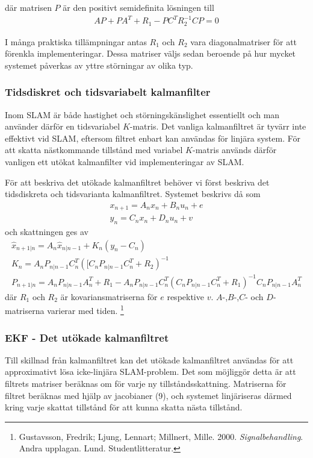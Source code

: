 \documentclass[a4paper,12pt,fleqn]{article}
\begin{document}
där matrisen $P$ är den positivt semidefinita lösningen till 
\begin{gather}
AP + PA^{T} + R_{1} - PC^{T}R_{2}^{-1}CP = 0
\end{gather}

I många praktiska tillämpningar antas $R_{1}$ och $R_{2}$ vara diagonalmatriser för att förenkla implementeringar. Dessa matriser väljs sedan beroende på hur mycket systemet påverkas av yttre störningar av olika typ. 

\subsubsection{Tidsdiskret och tidsvariabelt kalmanfilter} Inom SLAM är både hastighet och störningskänslighet essentiellt och man använder därför en tidsvariabel $K$-matris. Det vanliga kalmanfiltret är tyvärr inte effektivt vid SLAM, eftersom filtret enbart kan användas för linjära system. För att skatta nästkommande tillstånd med variabel $K$-matris används därför vanligen ett utökat kalmanfilter vid implementeringar av SLAM. 

För att beskriva det utökade kalmanfiltret behöver vi först beskriva det tidsdiskreta och tidsvarianta kalmanfiltret. Systemet beskrivs då som 
\begin{gather}
x_{n+1} = A_nx_n + B_nu_n+e \\
y_n = C_nx_n + D_nu_n + v
\end{gather}
och skattningen ges av
\begin{gather}
	\hat{x}_{n+1|n} = A_n\hat{x}_{n|n-1} + K_n(y_n-C_n) \\
	K_n=A_nP_{n|n-1}C_n^T([C_nP_{n|n-1}C_n^T+R_2)^{-1}	\\
	P_{n+1|n}=A_nP_{n|n-1}A_n^T+R_{1} 
	        -A_nP_{n|n-1}C_n^T(C_nP_{n|n-1}C_n^T+R_1)^{-1}C_nP_{n|n-1}A_n^T
\end{gather}
där $R_1$ och $R_2$ är kovariansmatriserna för $e$ respektive $v$. $A$-,$B$-,$C$- och $D$-matriserna varierar med tiden. \footnote{Gustavsson, Fredrik; Ljung, Lennart; Millnert, Mille. 2000. \textit{Signalbehandling}. Andra upplagan. Lund. Studentlitteratur.
}

\subsubsection{EKF - Det utökade kalmanfiltret}

Till skillnad från kalmanfiltret kan det utökade kalmanfiltret användas för att approximativt lösa icke-linjära SLAM-problem. Det som möjliggör detta är att filtrets matriser beräknas om för varje ny tillståndsskattning. Matriserna för filtret beräknas med hjälp av jacobianer (9), och systemet linjäriseras därmed kring varje skattat tillstånd för att kunna skatta nästa tillstånd. 
\end{document}
